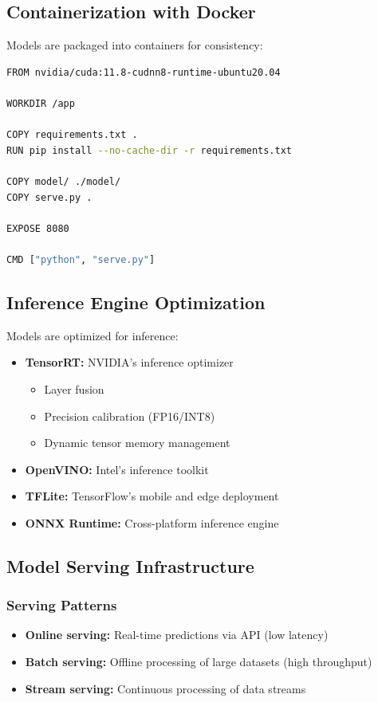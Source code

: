 \documentclass[11pt]{article}
\begin{document}
\subsection{Containerization with Docker}
Models are packaged into containers for consistency:

\lstset{style=bashstyle}
\begin{lstlisting}[caption=Dockerfile for Model Serving, language=bash]
FROM nvidia/cuda:11.8-cudnn8-runtime-ubuntu20.04

WORKDIR /app

COPY requirements.txt .
RUN pip install --no-cache-dir -r requirements.txt

COPY model/ ./model/
COPY serve.py .

EXPOSE 8080

CMD ["python", "serve.py"]
\end{lstlisting}

\subsection{Inference Engine Optimization}
Models are optimized for inference:

\begin{itemize}
    \item \textbf{TensorRT:} NVIDIA's inference optimizer
    \begin{itemize}
        \item Layer fusion
        \item Precision calibration (FP16/INT8)
        \item Dynamic tensor memory management
    \end{itemize}
    \item \textbf{OpenVINO:} Intel's inference toolkit
    \item \textbf{TFLite:} TensorFlow's mobile and edge deployment
    \item \textbf{ONNX Runtime:} Cross-platform inference engine
\end{itemize}

\subsection{Model Serving Infrastructure}

\subsubsection{Serving Patterns}
\begin{itemize}
    \item \textbf{Online serving:} Real-time predictions via API (low latency)
    \item \textbf{Batch serving:} Offline processing of large datasets (high throughput)
    \item \textbf{Stream serving:} Continuous processing of data streams
\end{itemize}
\end{document}
